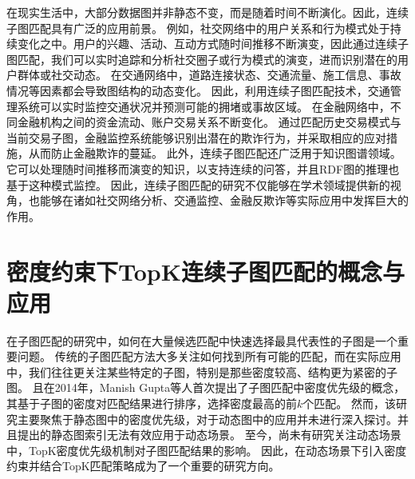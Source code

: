 在现实生活中，大部分数据图并非静态不变，而是随着时间不断演化。因此，连续子图匹配具有广泛的应用前景。
例如，社交网络中的用户关系和行为模式处于持续变化之中。用户的兴趣、活动、互动方式随时间推移不断演变，因此通过连续子图匹配，我们可以实时追踪和分析社交圈子或行为模式的演变，进而识别潜在的用户群体或社交动态\cite{wang2023mago}。
在交通网络中，道路连接状态、交通流量、施工信息、事故情况等因素都会导致图结构的动态变化\cite{traffic-graph-matching-DBLP:journals/pvldb/SongGCW14}。
因此，利用连续子图匹配技术，交通管理系统可以实时监控交通状况并预测可能的拥堵或事故区域。
在金融网络中，不同金融机构之间的资金流动、账户交易关系不断变化\cite{csm-timing-DBLP:conf/icde/Li0O019}。
通过匹配历史交易模式与当前交易子图，金融监控系统能够识别出潜在的欺诈行为，并采取相应的应对措施，从而防止金融欺诈的蔓延。
此外，连续子图匹配还广泛用于知识图谱领域。它可以处理随时间推移而演变的知识，以支持连续的问答\cite{barbieri2010c}，并且RDF图的推理也基于这种模式监控\cite{dell2014incremental}。
因此，连续子图匹配的研究不仅能够在学术领域提供新的视角，也能够在诸如社交网络分析、交通监控、金融反欺诈等实际应用中发挥巨大的作用。

\section{密度约束下TopK连续子图匹配的概念与应用}
在子图匹配的研究中，如何在大量候选匹配中快速选择最具代表性的子图是一个重要问题。
传统的子图匹配方法大多关注如何找到所有可能的匹配，而在实际应用中，我们往往更关注某些特定的子图，特别是那些密度较高、结构更为紧密的子图。
且在2014年，Manish Gupta等人首次提出了子图匹配中密度优先级的概念\cite{static-topk-Gupta-DBLP:conf/icde/GuptaGYCH14}，其基于子图的密度对匹配结果进行排序，选择密度最高的前$k$个匹配。
然而，该研究主要聚焦于静态图中的密度优先级，对于动态图中的应用并未进行深入探讨。并且提出的静态图索引无法有效应用于动态场景。
至今，尚未有研究关注动态场景中，TopK密度优先级机制对子图匹配结果的影响。
因此，在动态场景下引入密度约束并结合TopK匹配策略成为了一个重要的研究方向。

